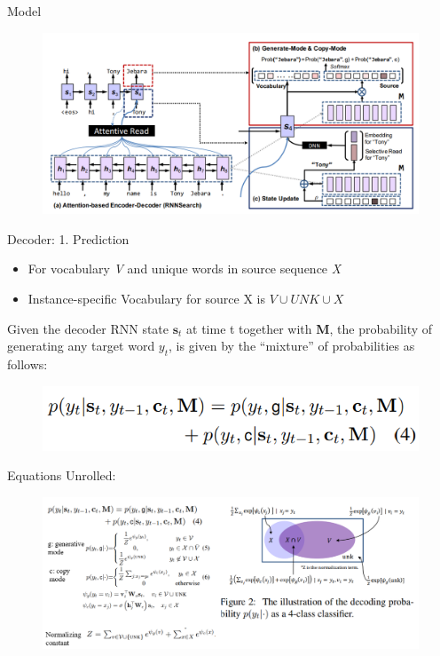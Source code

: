 \documentclass{beamer}
\begin{document}
\begin{frame}{Model}
\begin{figure}
        \centering
        \includegraphics[width = \textwidth]{copynet.PNG}
\end{figure}
\end{frame}

\begin{frame}{Decoder: 1. Prediction}
    \begin{itemize}
        \item For vocabulary \textit{V} and unique words in source sequence \textit{X}
        \item Instance-specific Vocabulary for source X is $\textit{V} \cup UNK \cup \textit{X}$
    \end{itemize}
    Given the decoder RNN state $\textbf{s}_t$ at time t together with \textbf{M}, the probability of generating any target word $y_t$, is given by the “mixture” of probabilities as follows:
    \begin{figure}
        \centering
        \includegraphics{pred_eq.PNG}
    \end{figure}
\end{frame}

\begin{frame}{Equations Unrolled:}
    \begin{figure}
        \centering
        \includegraphics[width = 1.05\linewidth]{pred_eq_all.PNG}
    \end{figure}
       
\end{frame}
\end{document}
